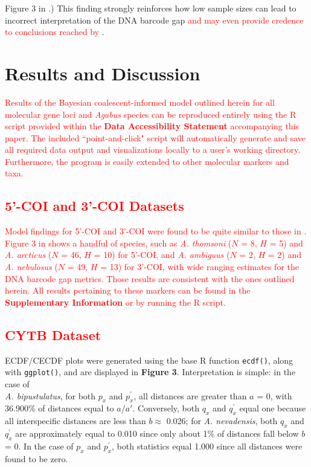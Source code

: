 \documentclass[12pt]{article}
\begin{document}
Figure 3 in \citet{phillips2024measure}.) This finding strongly reinforces how low sample sizes can lead to incorrect interpretation of the DNA barcode gap \textcolor{red}{and may even provide credence to conclusions reached by \citet{pallares2024genomic}}.

\section{Results and Discussion}

\textcolor{red}{Results of the Bayesian coalescent-informed model outlined herein for all molecular gene loci and \textit{Agabus} species can be reproduced entirely using the R script provided within the \textbf{Data Accessibility Statement} accompanying this paper. The included ``point-and-click" script will automatically generate and save all required data output and visualizations locally to a user's working directory. Furthermore, the program is easily extended to other molecular markers and taxa.}

\subsection{\textcolor{red}{5'-COI and 3'-COI Datasets}}

\textcolor{red}{Model findings for 5'-COI and 3'-COI were found to be quite similar to those in \citet{phillips2024measure}. Figure 3 in \citet{phillips2024measure} shows a handful of species, such as \textit{A. thomsoni} ($N$ = 8, $H$ = 5) and \textit{A. arcticus} ($N$ = 46, $H$ = 10) for 5'-COI, and \textit{A. ambiguus} ($N$ = 2, $H$ = 2) and \textit{A. nebulosus} ($N$ = 49, $H$ = 13) for 3'-COI, with wide ranging estimates for the DNA barcode gap metrics. Those results are consistent with the ones outlined herein. All results pertaining to these markers can be found in the \textbf{Supplementary Information} or by running the R script.}

\subsection{\textcolor{red}{CYTB Dataset}}

ECDF/CECDF plots were generated using the base R function {\tt ecdf()}, along with {\tt ggplot()}, and are displayed in \textbf{Figure 3}. Interpretation is simple: in the case of \\ \textit{A. bipustulatus}, for both $p_x$ and $p^{'}_x$, all distances are greater than $a$ = 0, with 36.900\% of distances equal to $a/a'$. Conversely, both $q_x$ and $q^{'}_x$ equal one because all interspecific distances are less than $b \approx$ 0.026; for \textit{A. nevadensis}, both $q_x$ and $q^{'}_x$ are approximately equal to 0.010 since only about 1\% of distances fall below $b$ = 0. In the case of $p_x$ and $p^{'}_x$, both statistics equal 1.000 since all distances were found to be zero.
\end{document}
